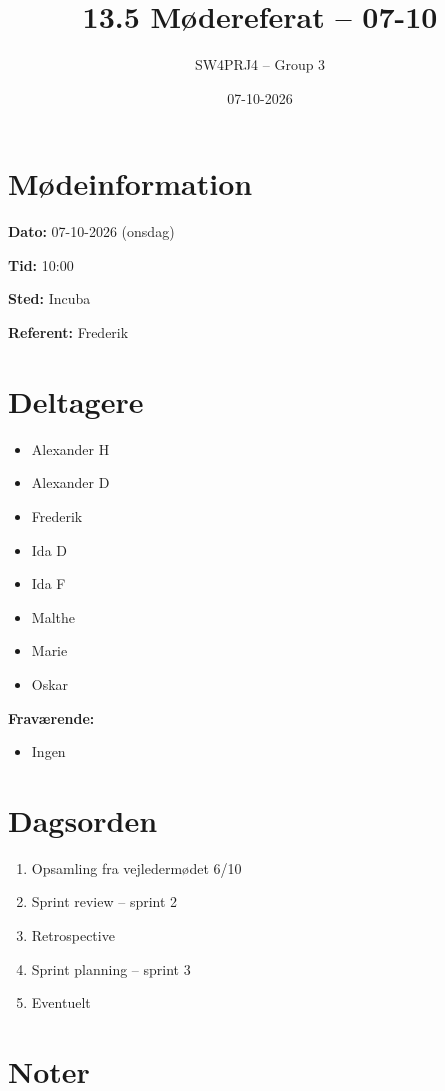 \documentclass[a4paper,11pt]{article}
\title{13.5 Mødereferat -- 07-10}
\author{SW4PRJ4 -- Group 3}
\date{07-10-2026}
\begin{document}
\maketitle

\section*{Mødeinformation}

\textbf{Dato:} 07-10-2026 (onsdag)

\textbf{Tid:} 10:00

\textbf{Sted:} Incuba

\textbf{Referent:} Frederik

\section*{Deltagere}

\begin{itemize}
    \item Alexander H
    \item Alexander D
    \item Frederik
    \item Ida D
    \item Ida F
    \item Malthe
    \item Marie
    \item Oskar
\end{itemize}

\textbf{Fraværende:}

\begin{itemize}
    \item Ingen
\end{itemize}

\section*{Dagsorden}

\begin{enumerate}
    \item Opsamling fra vejledermødet 6/10
    \item Sprint review -- sprint 2
    \item Retrospective
    \item Sprint planning -- sprint 3
    \item Eventuelt
\end{enumerate}

\section*{Noter}
\end{document}
